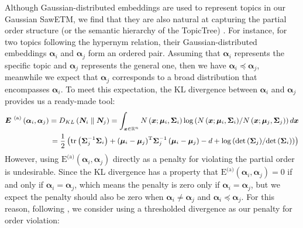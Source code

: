 \documentclass{article}
\newcommand{\Ev}[0]{\ensuremath{\boldsymbol{E}} }
\newcommand{\Nv}[0]{\ensuremath{\boldsymbol{N}} }
\newcommand{\mz}[1]{{\color{red}{[mz:#1]}}}
\begin{document}
Although Gaussian-distributed embeddings are used to represent topics in our Gaussian SawETM, we find that they are also natural at capturing the partial order structure (or the semantic hierarchy of the TopicTree) \cite{das2015gaussian, athiwaratkun2018hierarchical}. For instance, for two topics following the hypernym relation, their Gaussian-distributed embeddings $\bm{\alpha}_i$ and $\bm{\alpha}_j$ form an ordered pair. Assuming that $\bm{\alpha}_i$ represents the specific topic and $\bm{\alpha}_j$ represents the general one, then we have $\bm{\alpha}_i \preceq \bm{\alpha}_j$, meanwhile we expect that $\bm{\alpha}_j$ corresponds to a broad distribution that encompasses $\bm{\alpha}_i$. To meet this expectation, the KL divergence between $\bm{\alpha}_i$ and $\bm{\alpha}_j$ provides us a ready-made tool:
\begin{equation} \label{KL}
\small
\begin{split}
\mbox{\Ev}^{\text{(a)}} \left( {{\bm{\alpha} _i},{\bm{\alpha} _j}} \right) = {D_{KL}}\left( {{\Nv_i}\parallel {\Nv_j}} \right) = \int_{\bm{x} \in {\mathbb{R}^n}} {N\left( {\bm{x};{\bm{\mu} _i},{\bm{\Sigma} _i}} \right)\log \left( {{{N\left( {\bm{x};{\bm{\mu} _i},{\bm{\Sigma} _i}} \right)} \mathord{\left/
 {\vphantom {{N\left( {\bm{x};{\bm{\mu} _i},{\bm{\Sigma} _i}} \right)} {N\left( {\bm{x};{\bm{\mu} _j},{\bm{\Sigma} _j}} \right)}}} \right.
 \kern-\nulldelimiterspace} {N\left( {\bm{x};{\bm{\mu} _j},{\bm{\Sigma} _j}} \right)}}} \right)d\bm{x}} \notag \\
  = \frac{1}{2}\left( {{\text{tr}}\left( {\bm{\Sigma} _j^{ - 1}{\bm{\Sigma} _i}} \right) + {{\left( {{\bm{\mu} _i} - {\bm{\mu} _j}} \right)}^{\text{T}}}\bm{\Sigma} _j^{ - 1}\left( {{\bm{\mu} _i} - {\bm{\mu} _j}} \right) - d + \log \left( {{{\det \left( {{\bm{\Sigma} _j}} \right)} \mathord{\left/
 {\vphantom {{\det \left( {{\bm{\Sigma} _j}} \right)} {\det \left( {{\bm{\Sigma} _i}} \right)}}} \right.
 \kern-\nulldelimiterspace} {\det \left( {{\bm{\Sigma} _i}} \right)}}} \right)} \right)
\end{split}
\end{equation}
However, using $\mbox{E}^{\text{(a)}}({\bm{\alpha}_i},{\bm{\alpha}_j})$ directly as a penalty for violating the partial order is undesirable. Since the KL divergence has a property that $\mbox{E}^{\text{(a)}}({\bm{\alpha}_i},{\bm{\alpha}_j})=0$ if and only if $\bm{\alpha}_i=\bm{\alpha}_j$, which means the penalty is zero only if $\bm{\alpha}_i=\bm{\alpha}_j$, but we expect the penalty should also be zero when $\bm{\alpha}_i \neq \bm{\alpha}_j$ and $\bm{\alpha}_i \preceq \bm{\alpha}_j$. For this reason, following \citet{athiwaratkun2018hierarchical}, we consider using a thresholded divergence as our penalty for order violation:
\end{document}
